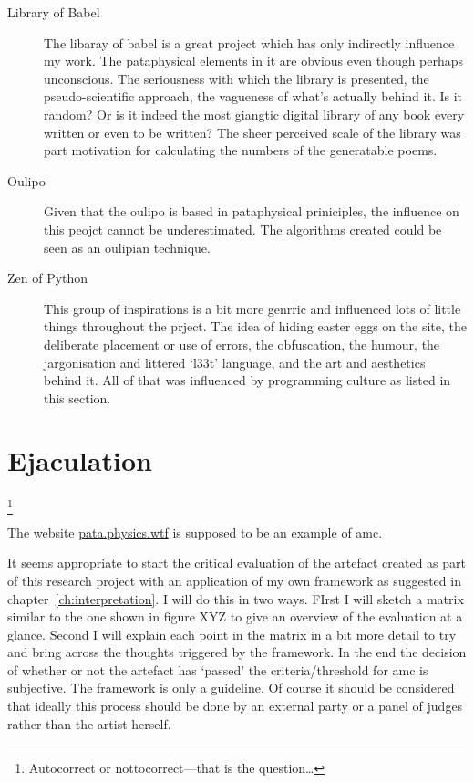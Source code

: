 \begin{description}
  \item[Library of Babel] The libaray of babel is a great project which has only indirectly influence my work. The pataphysical elements in it are obvious even though perhaps unconscious. The seriousness with which the library is presented, the pseudo-scientific approach, the vagueness of what's actually behind it. Is it random? Or is it indeed the most giangtic digital library of any book every written or even to be written? The sheer perceived scale of the library was part motivation for calculating the numbers of the generatable poems.
  \item[Oulipo] Given that the \gls{oulipo} is based in pataphysical priniciples, the influence on this peojct cannot be underestimated. The algorithms created could be seen as an oulipian technique.
  \item[Zen of Python] This group of inspirations is a bit more genrric and influenced lots of little things throughout the prject. The idea of hiding easter eggs on the site, the deliberate placement or use of errors, the obfuscation, the humour, the jargonisation and littered `l33t' language, and the art and aesthetics behind it. All of that was influenced by programming culture as listed in this section.
\end{description}


\section{Ejaculation}\footnote{Autocorrect or nottocorrect---that is the question\ldots}


The website \url{pata.physics.wtf} is supposed to be an example of \gls{amc}.

It seems appropriate to start the critical evaluation of the artefact created as part of this research project with an application of my own framework as suggested in chapter~\ref{ch:interpretation}. I will do this in two ways. FIrst I will sketch a matrix similar to the one shown in figure XYZ to give an overview of the evaluation at a glance. Second I will explain each point in the matrix in a bit more detail to try and bring across the thoughts triggered by the framework. In the end the decision of whether or not the artefact has `passed' the criteria/threshold for \gls{amc} is subjective. The framework is only a guideline. Of course it should be considered that ideally this process should be done by an external party or a panel of judges rather than the artist herself.


